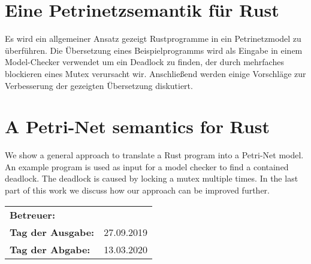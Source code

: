 \section*{Eine Petrinetzsemantik für Rust}
Es wird ein allgemeiner Ansatz gezeigt Rustprogramme in ein Petrinetzmodel zu überführen.
Die Übersetzung eines Beispielprogramms wird als Eingabe in einem Model-Checker verwendet um ein Deadlock zu finden, der durch mehrfaches blockieren eines Mutex verursacht wir.
Anschließend werden einige Vorschläge zur Verbesserung der gezeigten Übersetzung diskutiert.

\section*{A Petri-Net semantics for Rust}
We show a general approach to translate a Rust program into a Petri-Net model.
An example program is used as input for a model checker to find a contained deadlock.
The deadlock is caused by locking a mutex multiple times.
In the last part of this work we discuss how our approach can be improved further.

\vfill

\begin{tabular}{ll}
	\bfseries Betreuer: & \parbox[t]{10cm}{\betreuer }\vspace{5mm} \\
	\bfseries Tag der Ausgabe: & 27.09.2019 \\
	\bfseries Tag der Abgabe: & 13.03.2020 \\
\end{tabular}
